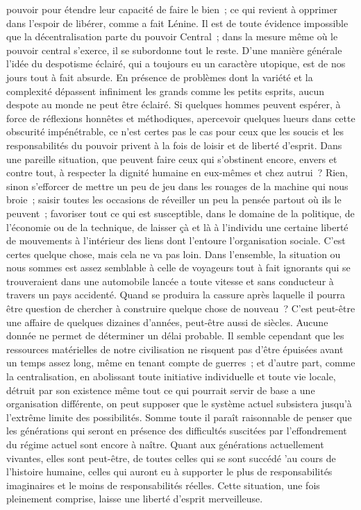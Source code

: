 \documentclass[french,twoside]{book} %
\begin{document}
pouvoir pour étendre leur capacité de faire le bien ; ce qui revient à opprimer dans l'espoir de libérer, comme a fait Lénine. Il est de toute évidence impossible que la décentralisation parte du pouvoir Central ; dans la mesure même où le pouvoir central s'exerce, il se subordonne tout le reste. D'une manière générale l'idée du despotisme éclairé, qui a toujours eu un caractère utopique, est de nos jours tout à fait absurde. En présence de problèmes dont la variété et la complexité dépassent infiniment les grands comme les petits esprits, aucun despote au monde ne peut être éclairé. Si quelques hommes peuvent espérer, à force de réflexions honnêtes et méthodiques, apercevoir quelques lueurs dans cette obscurité impénétrable, ce n'est certes pas le cas pour ceux que les soucis et les responsabilités du pouvoir privent à la fois de loisir et de liberté d'esprit. Dans une pareille situation, que peuvent faire ceux qui s'obstinent encore, envers et contre tout, à respecter la dignité humaine en eux-mêmes et chez autrui ? Rien, sinon s'efforcer de mettre un peu de jeu dans les rouages de la machine qui nous broie ; saisir toutes les occasions de réveiller un peu la pensée partout où ils le peuvent ; favoriser tout ce qui est susceptible, dans le domaine de la politique, de l'économie ou de la technique, de laisser çà et là à l'individu une certaine liberté de mouvements à l'intérieur des liens dont l'entoure l'organisation sociale. C'est certes quelque chose, mais cela ne va pas loin. Dans l'ensemble, la situation ou nous sommes est assez semblable à celle de voyageurs tout à fait ignorants qui se trouveraient dans une automobile lancée a toute vitesse et sans conducteur à travers un pays accidenté. Quand se produira la cassure après laquelle il pourra être question de chercher à construire quelque chose de nouveau ? C'est peut-être une affaire de quelques dizaines d'années, peut-être aussi de siècles. Aucune donnée ne permet de déterminer un délai probable. Il semble cependant que les ressources matérielles de notre civilisation ne risquent pas d'être épuisées avant un temps assez long, même en tenant compte de guerres ; et d'autre part, comme la centralisation, en abolissant toute initiative individuelle et toute vie locale, détruit par son existence même tout ce qui pourrait servir de base a une organisation différente, on peut supposer que le système actuel subsistera jusqu'à l'extrême limite des possibilités. Somme toute il paraît raisonnable de penser que les générations qui seront en présence des difficultés suscitées par l'effondrement du régime actuel sont encore à naître. Quant aux générations actuellement vivantes, elles sont peut-être, de toutes celles qui se sont succédé 'au cours de l'histoire humaine, celles qui auront eu à supporter le plus de responsabilités imaginaires et le moins de responsabilités réelles. Cette situation, une fois pleinement comprise, laisse une liberté d'esprit merveilleuse.
\end{document}
